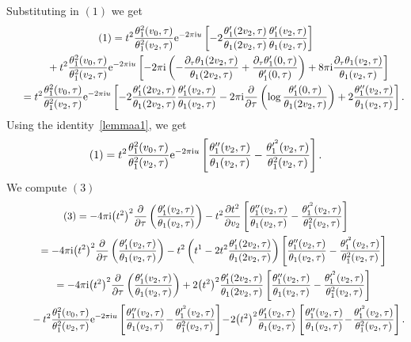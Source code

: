 \documentclass[10pt,a4paper]{amsart}
\numberwithin{equation}{section}
\begin{document}
Substituting in $(1)$ we get
\begin{gather*}
(1)=t^2\frac{\theta_1^2(v_0,\tau)}{\theta_1^2(v_2,\tau)}{\rm e}^{-2\pi {\rm i} u}\left[ - 2\frac{\theta_1^{\prime}(2v_2,\tau)}{\theta_1(2v_2,\tau)} \frac{\theta_1^{\prime}(v_2,\tau)}{\theta_1(v_2,\tau)}\right]
\\ \hphantom{(1)=}
+t^2\frac{\theta_1^2(v_0,\tau)}{\theta_1^2(v_2,\tau)}{\rm e}^{-2\pi {\rm i} u}\left[ - 2\pi {\rm i}\left( - \frac{\partial_{\tau}\theta_1(2v_2,\tau)}{\theta_1(2v_2,\tau)} +\frac{\partial_{\tau}\theta_1^{\prime}(0,\tau)}{\theta_1^{\prime}(0,\tau)}\right)+8\pi {\rm i}\frac{\partial_{\tau}\theta_1(v_2,\tau)}{\theta_1(v_2,\tau)}\right]
\\ \hphantom{(1)}
{}=t^2\frac{\theta_1^2(v_0,\tau)}{\theta_1^2(v_2,\tau)}{\rm e}^{-2\pi {\rm i} u}\left[ - 2\frac{\theta_1^{\prime}(2v_2,\tau)}{\theta_1(2v_2,\tau)} \frac{\theta_1^{\prime}(v_2,\tau)}{\theta_1(v_2,\tau)}-2\pi {\rm i}\frac{\partial}{\partial \tau}\left( \log\frac{\theta_1^{\prime}(0,\tau)}{\theta_1(2v_2,\tau)}\right) +2\frac{\theta_1^{\prime\prime}(v_2,\tau)}{\theta_1(v_2,\tau)}\right].
\end{gather*}
Using the identity~\eqref{lemmaa1}, we get
\begin{gather*}
(1)=t^2\frac{\theta_1^2(v_0,\tau)}{\theta_1^2(v_2,\tau)}{\rm e}^{-2\pi {\rm i} u}\left[\frac{\theta_1^{\prime\prime}(v_2,\tau)}{\theta_1(v_2,\tau)} -\frac{\theta_1^{\prime^2}(v_2,\tau)}{\theta_1^2(v_2,\tau)}\right].
\end{gather*}
We compute $(3)$
\begin{gather*}
(3)=-4\pi {\rm i}\big(t^2\big)^2\frac{\partial}{\partial \tau}\left(\frac{\theta_1^{\prime}(v_2,\tau)}{\theta_1(v_2,\tau)}\right)
-t^2\frac{\partial t^2}{\partial v_2}\left[\frac{\theta_1^{\prime\prime}(v_2,\tau)}{\theta_1(v_2,\tau)} -\frac{\theta_1^{\prime^2}(v_2,\tau)}{\theta_1^2(v_2,\tau)}\right]
\\ \hphantom{(3)}
{}=-4\pi {\rm i}\big(t^2\big)^2\frac{\partial}{\partial \tau}\left(\frac{\theta_1^{\prime}(v_2,\tau)}{\theta_1(v_2,\tau)}\right) -t^2\left(t^1-2t^2\frac{\theta_1^{\prime}(2v_2,\tau)}{\theta_1(2v_2,\tau)}\right) \left[\frac{\theta_1^{\prime\prime}(v_2,\tau)}{\theta_1(v_2,\tau)} -\frac{\theta_1^{\prime^2}(v_2,\tau)}{\theta_1^2(v_2,\tau)}\right]
\\ \hphantom{(3)}
{}=-4\pi {\rm i}\big(t^2\big)^2\frac{\partial}{\partial \tau}\left(\frac{\theta_1^{\prime}(v_2,\tau)}{\theta_1(v_2,\tau)}\right)
+2\big(t^2\big)^2\frac{\theta_1^{\prime}(2v_2,\tau)}{\theta_1(2v_2,\tau)} \left[\frac{\theta_1^{\prime\prime}(v_2,\tau)}{\theta_1(v_2,\tau)} -\frac{\theta_1^{\prime^2}(v_2,\tau)}{\theta_1^2(v_2,\tau)}\right]
\\ \hphantom{(3)=}
{}-t^2\frac{\theta_1^2(v_0,\tau)}{\theta_1^2(v_2,\tau)}{\rm e}^{-2\pi {\rm i} u}\left[\frac{\theta_1^{\prime\prime}(v_2,\tau)}{\theta_1(v_2,\tau)} \!-\!\frac{\theta_1^{\prime^2}(v_2,\tau)}{\theta_1^2(v_2,\tau)}\right]
\!-\!2\big(t^2\big)^2\frac{\theta_1^{\prime}(v_2,\tau)}{\theta_1(v_2,\tau)} \left[\frac{\theta_1^{\prime\prime}(v_2,\tau)}{\theta_1(v_2,\tau)} \!-\!\frac{\theta_1^{\prime^2}(v_2,\tau)}{\theta_1^2(v_2,\tau)}\right].
\end{gather*}
\end{document}
